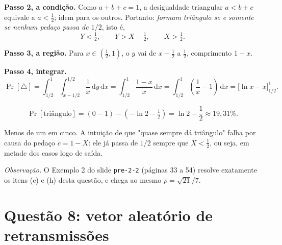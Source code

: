 \documentclass[11pt,a4paper]{article}
\newcommand{\dd}{\,\mathrm{d}}
\renewcommand{\Pr}{\operatorname{Pr}}
\begin{document}
\textbf{Passo 2, a condição.} Como $a+b+c=1$, a desigualdade triangular $a<b+c$
equivale a $a<\frac12$; idem para os outros. Portanto:
\emph{formam triângulo se e somente se nenhum pedaço passa de $1/2$}, isto é,
\[
Y<\tfrac12,\qquad Y>X-\tfrac12,\qquad X>\tfrac12 .
\]

\textbf{Passo 3, a região.} Para $x\in(\frac12,1)$, o $y$ vai de $x-\frac12$ a
$\frac12$, comprimento $1-x$.

\textbf{Passo 4, integrar.}
\[
\Pr[\triangle]=\int_{1/2}^{1}\!\!\int_{x-1/2}^{1/2}\frac1x\dd y\dd x
=\int_{1/2}^{1}\frac{1-x}{x}\dd x
=\int_{1/2}^{1}\left(\frac1x-1\right)\dd x
=\Big[\ln x-x\Big]_{1/2}^{1}.
\]

\begin{resp}
\[
\Pr[\text{triângulo}]=(0-1)-\left(-\ln 2-\tfrac12\right)=\ln 2-\frac12\approx 19{,}31\% .
\]
\end{resp}

Menos de um em cinco. A intuição de que "quase sempre dá triângulo" falha por causa
do pedaço $c=1-X$: ele já passa de $1/2$ sempre que $X<\frac12$, ou seja, em metade
dos casos logo de saída.

\begin{center}
\end{center}

\emph{Observação.} O Exemplo 2 do slide \texttt{pre-2-2} (páginas 33 a 54) resolve
exatamente os itens (c) e (h) desta questão, e chega ao mesmo $\rho=\sqrt{21}/7$.

\clearpage
\section{Questão 8: vetor aleatório de retransmissões}
\end{document}

